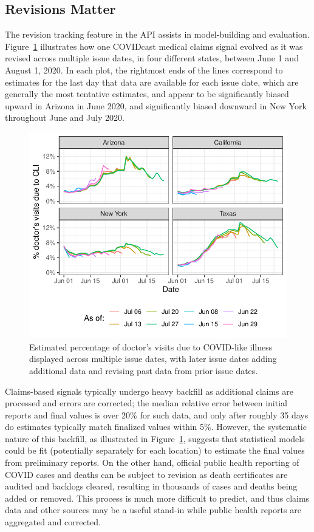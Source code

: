 \documentclass[9pt,twocolumn,twoside,lineno]{pnas-new}
\begin{document}
\subsection{Revisions Matter}

The revision tracking feature in the API assists in model-building and
evaluation. Figure~\ref{fig:dv_as_of} illustrates how one COVIDcast medical
claims signal evolved as it was revised across multiple issue dates, in four
different states, between June 1 and August 1, 2020. In each plot, the rightmost
ends of the lines correspond to estimates for the last day that data are
available for each issue date, which are generally the most tentative estimates,
and appear to be significantly biased upward in Arizona in June 2020, and
significantly biased downward in New York throughout June and July 2020.

\begin{figure}[t]
  \includegraphics[width=\columnwidth]{fig/dv_as_of.pdf}
  \caption{Estimated percentage of doctor's visits due to COVID-like illness
    displayed across multiple issue dates, with later issue dates adding
    additional data and revising past data from prior issue dates.}
  \label{fig:dv_as_of}
\end{figure}

Claims-based signals typically undergo heavy backfill as additional claims are
processed and errors are corrected; the median relative error between initial
reports and final values is over 20\% for such data, and only after roughly 35
days do estimates typically match finalized values within 5\%. However, the
systematic nature of this backfill, as illustrated in Figure~\ref{fig:dv_as_of},
suggests that statistical models could be fit (potentially separately for each
location) to estimate the final values from preliminary reports. On the other
hand, official public health reporting of COVID cases and deaths can be subject
to revision as death certificates are audited and backlogs cleared, resulting in
thousands of cases and deaths being added or removed. This process is much more
difficult to predict, and thus claims data and other sources may be a useful
stand-in while public health reports are aggregated and corrected.
\end{document}

